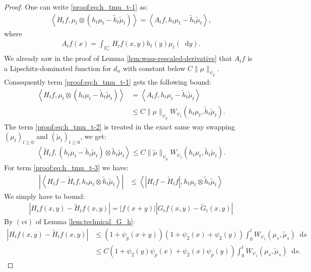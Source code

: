 \documentclass[11pt,a4paper]{article}
\newcommand{\RRP}{\mathbb{R}^+_*}
\newcommand{\Proc}[1]{\left(#1\right)_{t\geq 0}}
\newcommand{\brac}[1]{\left\langle#1\right\rangle}
\newcommand{\dd}{\mathop{}\!\mathrm{d}}
\begin{document}
\begin{proof}
    One can write \eqref{proof:eq:h_tmu_t-1} as:
    \begin{align*}
        \brac{H_tf,\mu_t \otimes\left(h_t\mu_t -  \tilde{h}_t \tilde{\mu}_t\right)} = \brac{A_tf,h_t\mu_t -  \tilde{h}_t \tilde{\mu}_t},
    \end{align*}
    where
    \begin{align*}
        A_tf(x) = \int_{\RRP} H_tf(x,y) h_t(y)\mu_t(\dd y).
    \end{align*}
    We already saw in the proof of Lemma \ref{lem:wass-rescaled-derivative} that $A_tf$ is a Lipschitz-dominated function for $d_{\alpha}$ with constant below $C\|\mu\|_{\psi_{p}}$. Consequently term \eqref{proof:eq:h_tmu_t-1} gets the following bound:
    \begin{align*}
        \brac{H_tf,\mu_t \otimes\left(h_t\mu_t -  \tilde{h}_t \tilde{\mu}_t\right)} &= \brac{A_tf,h_t\mu_t -  \tilde{h}_t \tilde{\mu}_t}\\
        &\leq C\| \mu\|_{\psi_{p}} W_{\psi_1}(h_t\mu_t, \tilde{h}_t \tilde{\mu}_t).
    \end{align*}
    The term \eqref{proof:eq:h_tmu_t-2} is treated in the exact same way swapping $\Proc{\mu_t}$ and $\Proc{\tilde{\mu}_t}$, we get:
    \begin{align*}
        \brac{\tilde{H}_tf,\left(h_t\mu_t-\tilde{h}_t\tilde{\mu}_t\right) \otimes \tilde{h}_t \tilde{\mu}_t} \leq C\| \tilde{\mu}\|_{\psi_{p}} W_{\psi_1}(h_t\mu_t, \tilde{h}_t \tilde{\mu}_t).
    \end{align*} 
    For term \eqref{proof:eq:h_tmu_t-3} we have:
    \begin{align*}
        \left|\brac{H_tf - \tilde{H}_tf,h_t\mu_t \otimes \tilde{h}_t \tilde{\mu}_t}\right| &\leq \brac{\left|H_tf - \tilde{H}_tf\right|,h_t\mu_t \otimes  \tilde{h}_t \tilde{\mu}_t} 
    \end{align*}
    We simply have to bound:
    \begin{align*}
        \left|H_tf(x,y) - \tilde{H}_tf(x,y)\right| = |f(x+y)|\left|G_tf(x,y) - \tilde{G}_t(x,y)\right|
    \end{align*}
    By $(vi)$ of Lemma \ref{lem:technical_G_h}:
    \begin{align*}
        \left|H_tf(x,y) - \tilde{H}_tf(x,y)\right| &\leq \left(1 + \psi_{p}(x + y) \right)\left(1 + \psi_{2}(x) + \psi_{2}(y) \right)\int_0^t W_{\psi_1}(\mu_s,\tilde{\mu}_s)\dd s\\
        &\leq C \left(1 +  \psi_{2}(y)\psi_{p}(x) +  \psi_{2}(x)\psi_{p}(y) \right)\int_0^t W_{\psi_1}(\mu_s,\tilde{\mu}_s)\dd s.

\end{align*}
\end{proof}
\end{document}

